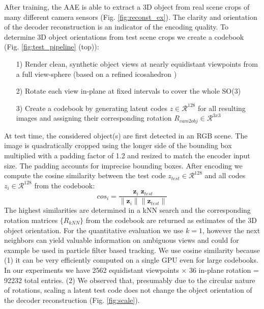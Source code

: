 After training, the \gls{AAE} is able to extract a 3D object from real scene crops of many different camera sensors (Fig. \ref{fig:reconst_ex}). The clarity and orientation of the decoder reconstruction is an indicator of the encoding quality. To determine 3D object orientations from test scene crops we create a codebook (Fig. \ref{fig:test_pipeline} (top)):
\begin{itemize}
	\item[1)]  Render clean, synthetic object views at nearly equidistant viewpoints from a full view-sphere (based on a refined icosahedron \citep{hinterstoisser2008simultaneous})
	\item[2)] Rotate each view in-plane at fixed intervals to cover the whole SO(3)
	\item[3)] Create a codebook by generating latent codes $z \in \mathcal{R}^{128}$ for all resulting images and assigning their corresponding rotation $R_{cam2obj} \in \mathcal{R}^{3x3}$
\end{itemize}

At test time, the considered object(s) are first detected in an RGB scene. The image is quadratically cropped using the longer side of the bounding box multiplied with a padding factor of 1.2 and resized to match the encoder input size. The padding accounts for imprecise bounding boxes. After encoding we compute the cosine similarity between the test code $z_{test} \in \mathcal{R}^{128}$ and all codes $z_{i} \in \mathcal{R}^{128}$ from the codebook:
\begin{equation}
cos_i = \frac{\pmb z_i \;\pmb z_{test}}{\lVert \pmb z_i \rVert \lVert \pmb z_{test} \rVert}
\end{equation}
The highest similarities are determined in a \gls{kNN} search and the corresponding rotation matrices $ \{R_{kNN}\}$ from the codebook are returned as estimates of the 3D object orientation. For the quantitative evaluation we use $k=1$, however the next neighbors can yield valuable information on ambiguous views and could for example be used in particle filter based tracking. We use cosine similarity because (1) it can be very efficiently computed on a single GPU even for large codebooks. In our experiments we have 2562 equidistant viewpoints $\times$ 36 in-plane rotation = 92232 total entries. (2) We observed that, presumably due to the circular nature of rotations, scaling a latent test code does not change the object orientation of the decoder reconstruction (Fig. \ref{fig:scale}).

